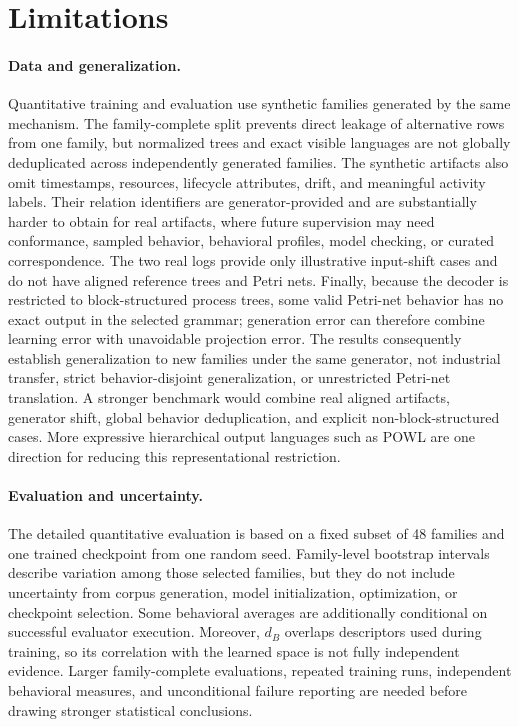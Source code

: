 \documentclass[pdflatex,sn-basic]{sn-jnl}
\begin{document}
\FloatBarrier
\section{Limitations}\label{sec:threats}

\paragraph{Data and generalization.}
Quantitative training and evaluation use synthetic families generated by the same mechanism. The family-complete split prevents direct leakage of alternative rows from one family, but normalized trees and exact visible languages are not globally deduplicated across independently generated families. The synthetic artifacts also omit timestamps, resources, lifecycle attributes, drift, and meaningful activity labels. Their relation identifiers are generator-provided and are substantially harder to obtain for real artifacts, where future supervision may need conformance, sampled behavior, behavioral profiles, model checking, or curated correspondence. The two real logs provide only illustrative input-shift cases and do not have aligned reference trees and Petri nets. Finally, because the decoder is restricted to block-structured process trees, some valid Petri-net behavior has no exact output in the selected grammar; generation error can therefore combine learning error with unavoidable projection error. The results consequently establish generalization to new families under the same generator, not industrial transfer, strict behavior-disjoint generalization, or unrestricted Petri-net translation. A stronger benchmark would combine real aligned artifacts, generator shift, global behavior deduplication, and explicit non-block-structured cases. More expressive hierarchical output languages such as POWL are one direction for reducing this representational restriction.

\paragraph{Evaluation and uncertainty.}
The detailed quantitative evaluation is based on a fixed subset of 48 families and one trained checkpoint from one random seed. Family-level bootstrap intervals describe variation among those selected families, but they do not include uncertainty from corpus generation, model initialization, optimization, or checkpoint selection. Some behavioral averages are additionally conditional on successful evaluator execution. Moreover, $d_B$ overlaps descriptors used during training, so its correlation with the learned space is not fully independent evidence. Larger family-complete evaluations, repeated training runs, independent behavioral measures, and unconditional failure reporting are needed before drawing stronger statistical conclusions.
\end{document}
